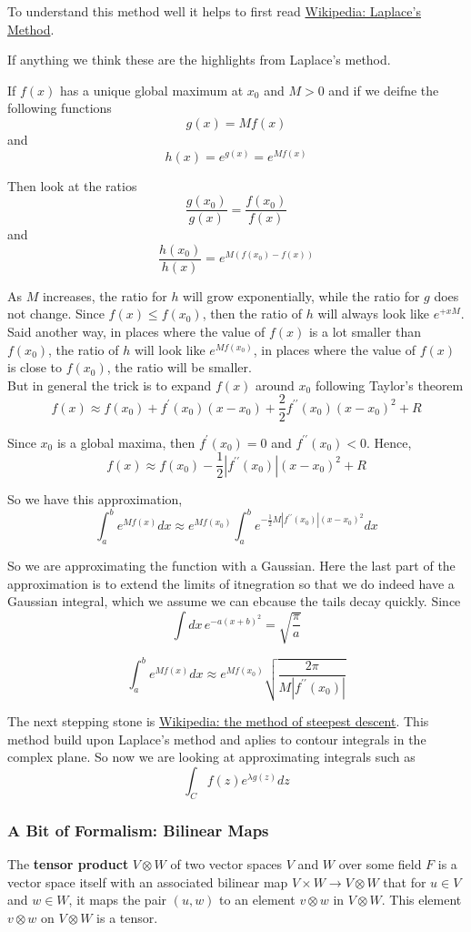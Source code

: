 To understand this method well it helps to first read
\href{https://en.wikipedia.org/wiki/Laplace%27s_method}{Wikipedia: Laplace's Method}.

If anything we think these are the highlights from Laplace's method.

If $f(x)$ has a unique global maximum at $x_0$ and $M>0$ and if we deifne the following functions
$$
g(x) = Mf(x)
$$
and
$$
h(x) = e^{g(x)} = e^{Mf(x)}
$$

Then look at the ratios
$$
\frac{g(x_0)}{g(x)} = \frac{f(x_0)}{f(x)}
$$
and
$$
\frac{h(x_0)}{h(x)} = e^{M(f(x_0) - f(x))}
$$

As $M$ increases, the ratio for $h$ will grow exponentially, while the ratio for $g$ does not change.
Since $f(x) \leq f(x_0)$, then the ratio of $h$ will always look like $e^{+{x}M}$.
Said another way, in places where the value of $f(x)$ is a lot smaller than $f(x_0)$, the ratio of $h$ will look like
$e^{Mf(x_0)}$, in places where the value of $f(x)$ is close to $f(x_0)$, the ratio will be smaller.
\\

But in general the trick is to expand $f(x)$ around $x_0$ following Taylor's theorem
$$
f(x) \approx
    f(x_0) + f^{\prime} (x_0) (x-x_0) + \frac{2}{2} f^{\prime\prime} (x_0) (x-x_0)^2 + R
$$

Since $x_0$ is a global maxima, then $f^{\prime} (x_0) = 0$ and $f^{\prime\prime} (x_0) < 0$.
Hence,
$$
f(x) \approx
    f(x_0) - \frac{1}{2} |f^{\prime\prime} (x_0)| (x-x_0)^2 + R
$$

So we have this approximation,
$$
\int_{a}^{b} e^{Mf(x)} dx \approx
    e^{Mf(x_0)} \int_{a}^{b} e^{- \frac{1}{2} M |f^{\prime\prime} (x_0)| (x-x_0)^2} dx
$$

So we are approximating the function with a Gaussian.
Here the last part of the approximation is to extend the limits of itnegration so that we do indeed have a Gaussian integral,
which we assume we can ebcause the tails decay quickly.
Since
$$
\int dx\, e^{-a(x+b)^2} = \sqrt{ \frac{\pi}{a} }
$$

$$
\int_{a}^{b} e^{Mf(x)} dx \approx
    e^{Mf(x_0)} \sqrt{ \frac{2\pi}{M |f^{\prime\prime} (x_0)|} }
$$

The next stepping stone is
\href{https://en.wikipedia.org/wiki/Method_of_steepest_descent}{Wikipedia: the method of steepest descent}.
This method build upon Laplace's method and aplies to contour integrals in the complex plane.
So now we are looking at approximating integrals such as
$$
\int_{C} f(z) e^{\lambda g(z)} dz
$$


\subsubsection{A Bit of Formalism: Bilinear Maps}


The \textbf{tensor product} $V \otimes W$ of two vector spaces $V$ and $W$ over some field $F$ is a vector space itself
with an associated bilinear map $V \times W \rightarrow V \otimes W$ that for $u \in V$ and $w \in W$, it maps the
pair $(u, w)$ to an element $v \otimes w$ in $V \otimes W$.
This element $v \otimes w$ on $V \otimes W$ is a tensor.